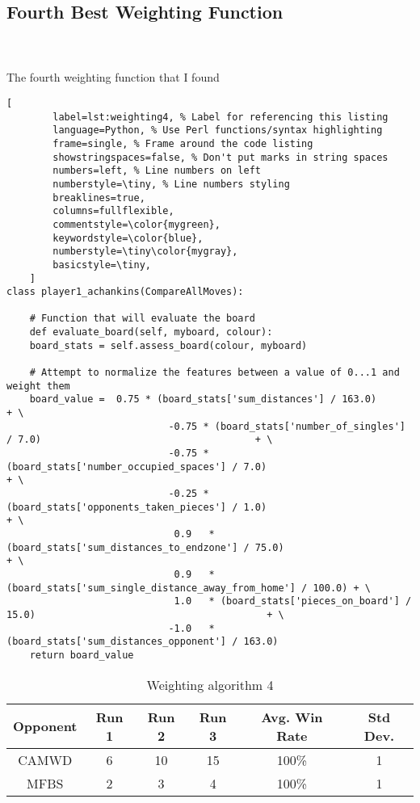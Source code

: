 \documentclass[
	12pt, %
]{fphw}
\begin{document}

\subsection{Fourth Best Weighting Function}

\hfill\\ \\  The fourth weighting function that I found

\begin{lstlisting}[
		label=lst:weighting4, % Label for referencing this listing
		language=Python, % Use Perl functions/syntax highlighting
		frame=single, % Frame around the code listing
		showstringspaces=false, % Don't put marks in string spaces
		numbers=left, % Line numbers on left
		numberstyle=\tiny, % Line numbers styling
		breaklines=true,
		columns=fullflexible,
		commentstyle=\color{mygreen},
		keywordstyle=\color{blue},
		numberstyle=\tiny\color{mygray},
		basicstyle=\tiny,
	]
class player1_achankins(CompareAllMoves):

    # Function that will evaluate the board
    def evaluate_board(self, myboard, colour):
    board_stats = self.assess_board(colour, myboard)

    # Attempt to normalize the features between a value of 0...1 and weight them
    board_value =  0.75 * (board_stats['sum_distances'] / 163.0)                                        + \
                            -0.75 * (board_stats['number_of_singles'] / 7.0)                                     + \
                            -0.75 * (board_stats['number_occupied_spaces'] / 7.0)                          + \
                            -0.25 * (board_stats['opponents_taken_pieces'] / 1.0)                            + \
                             0.9   * (board_stats['sum_distances_to_endzone'] / 75.0)                      + \
                             0.9   * (board_stats['sum_single_distance_away_from_home'] / 100.0) + \
                             1.0   * (board_stats['pieces_on_board'] / 15.0)                                        + \
                            -1.0   * (board_stats['sum_distances_opponent'] / 163.0)
    return board_value
\end{lstlisting}

\begin{table}[ht]
	\centering
	\begin{tabular}{||c | c c c c c||}
		\hline
		Opponent & Run 1&   Run 2 & Run 3 & Avg. Win Rate & Std Dev. \\ [0.5ex]
		\hline\hline
		CAMWD &  6 & 10 & 15 & 100\% & 1 \\
		\hline
		MFBS & 2 & 3 & 4 & 100\% & 1 \\ [1ex]
		\hline
	\end{tabular}
	\caption{Weighting algorithm 4}
	\label{table:4}
\end{table}
\end{document}
